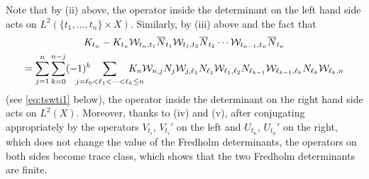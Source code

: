 \documentclass[letterpaper,reqno,11pt,oneside,final]{amsart}
\theoremstyle{definition}
\newcommand{\cw}{\mathcal{W}}
\newcommand{\Ml}{N}
\newcommand{\oM}{\overline{\Ml}}
\numberwithin{equation}{section}
\begin{document}
Note that by (ii) above, the operator inside the determinant on the left hand side acts on $L^2(\{t_1,\dots,t_n\}\times X)$.
Similarly, by (iii) above and the fact that
\begin{multline}
K_{t_n}-K_{t_n}\cw_{t_n,t_1}\oM_{t_1}\cw_{t_1,t_2}\oM_{t_2}\dotsm\cw_{t_{n-1},t_n}\oM_{t_n}\\
=\sum_{j=1}^n\sum_{k=0}^{n-j}(-1)^{k}\quad\smashoperator{\sum_{j=\ell_0<\ell_1<\dots<\ell_k\leq
        n}}\quad K_n\cw_{n,j}\Ml_{j}\cw_{{j},{{\ell_1}}}\Ml_{{\ell_1}}\cw_{{\ell_1},{\ell_2}}
    \Ml_{{\ell_{k-1}}}\cw_{{\ell_{k-1}},{\ell_k}}\Ml_{{\ell_k}}\cw_{{\ell_k},{n}}
\end{multline}
(see \eqref{eq:tswti1} below), the operator inside the determinant on the right hand side acts on $L^2(X)$.
Moreover, thanks to (iv) and (v), after conjugating appropriately by the operators $V_{t_i}$, $V_{t_i}'$ on the left and $U_{t_n}$, $U_{t_n}'$ on the right, which does not change the value of the Fredholm determinants, the operators on both sides become trace class, which shows that the two Fredholm determinants are finite.
\end{document}

